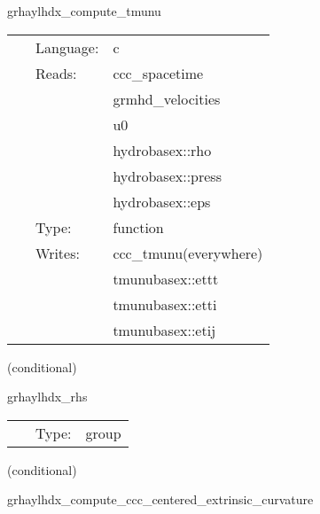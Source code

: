 \documentclass{article}
\begin{document}
\hspace{5mm} grhaylhdx\_compute\_tmunu 

\hspace{5mm}{\it compute stress-energy tensor and interpolate to vertices } 


\hspace{5mm}

 \begin{tabular*}{160mm}{cll} 
~ & Language:  & c \\ 
~ & Reads:  & ccc\_spacetime \\ 
~& ~ &grmhd\_velocities\\ 
~& ~ &u0\\ 
~& ~ &hydrobasex::rho\\ 
~& ~ &hydrobasex::press\\ 
~& ~ &hydrobasex::eps\\ 
~ & Type:  & function \\ 
~ & Writes:  & ccc\_tmunu(everywhere) \\ 
~& ~ &tmunubasex::ettt\\ 
~& ~ &tmunubasex::etti\\ 
~& ~ &tmunubasex::etij\\ 
\end{tabular*} 


\vspace{5mm}

   (conditional) 

\hspace{5mm} grhaylhdx\_rhs 

\hspace{5mm}{\it evaluate rhss grhd equations } 


\hspace{5mm}

 \begin{tabular*}{160mm}{cll} 
~ & Type:  & group \\ 
\end{tabular*} 


\vspace{5mm}

   (conditional) 

\hspace{5mm} grhaylhdx\_compute\_ccc\_centered\_extrinsic\_curvature 

\hspace{5mm}{\it interpolate extrinsic curvature to cell centers } 


\hspace{5mm}
\end{document}
